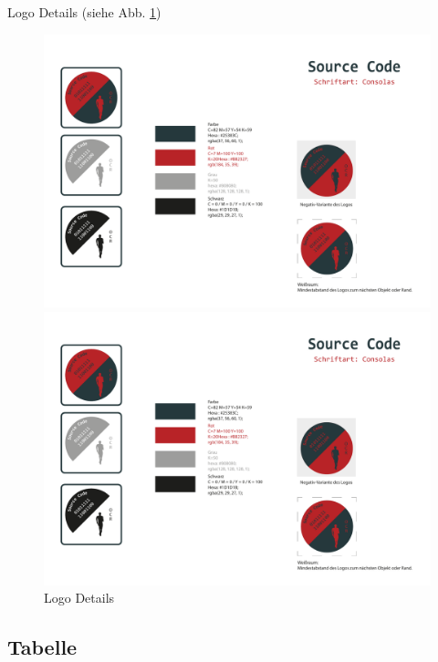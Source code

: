 Logo Details (siehe Abb. \ref{logo_details})
\begin{figure}[H]
	\centering
	\begin{minipage}[b]{0.49\textwidth}
		\includegraphics[width=\textwidth]{content/bsp/Logo-Details.pdf}
	\end{minipage}
	\hfill
	\begin{minipage}[b]{0.49\textwidth}
		\includegraphics[width=\textwidth]{content/bsp/Logo-Details.pdf}
	\end{minipage}
	\caption{Logo Details} \label{logo_details}
\end{figure}


\subsection{Tabelle}
\label{tabelle}

